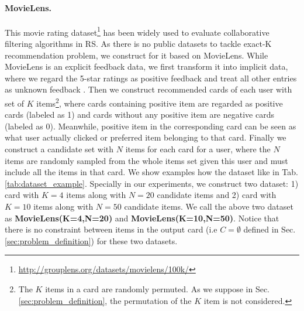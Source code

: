 \paragraph{\textbf{MovieLens.}}
This movie rating dataset\footnote{\url{http://grouplens.org/datasets/movielens/100k/}} has been
widely used to evaluate collaborative filtering algorithms in RS.
As there is no public datasets to tackle exact-K recommendation problem,
we construct for it based on MovieLens.
While MovieLens is an explicit
feedback data,
we first transform it into implicit
data, where we regard the 5-star ratings as positive feedback and treat all other entries as unknown feedback \cite{wang2017irgan}.
Then we construct recommended cards of each user with set of $K$ items\footnote{The $K$ items in a card are randomly permuted. As we suppose in Sec. \ref{sec:problem_definition}, the permutation of the $K$ item is not considered.},
where cards containing positive item are regarded as positive cards (labeled as 1) and cards without any positive item are negative cards (labeled as 0).
Meanwhile, positive item in the corresponding card can be seen as what user actually clicked or preferred item belonging to that card.
Finally we construct a candidate set with $N$ items for each card for a user, 
where the $N$ items are randomly sampled from the whole items set given this user and must include all the items in that card.
We show examples how the dataset like in Tab. \ref{tab:dataset_example}.
Specially in our experiments, we construct two dataset:
1) card with $K=4$ items along with $N=20$ candidate items and 
2) card with $K=10$ items along with $N=50$ candidate items.
We call the above two dataset as \textbf{MovieLens(K=4,N=20)} and \textbf{MovieLens(K=10,N=50)}.
Notice that there is no constraint between items in the output card (i.e $C=\emptyset$ defined in Sec. \ref{sec:problem_definition}) for these two datasets.
